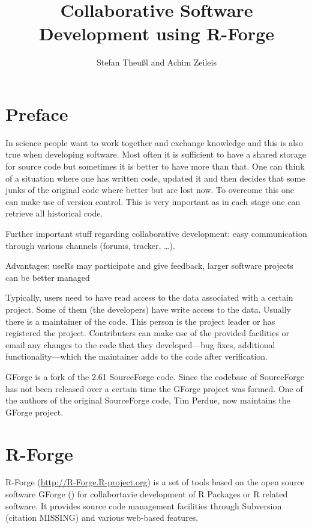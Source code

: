 \title{Collaborative Software Development using R-Forge}
\author{Stefan Theu\ss{}l and Achim Zeileis}

\maketitle


\section*{Preface}


In science people want to work together and exchange knowledge and
this is also true when developing software. Most often it is
sufficient to have a shared storage for source code but sometimes it
is better to have more than that. One can think of a situation where one has
written code, updated it and then decides that some junks of the
original code where better but are lost now. To overcome this one can
make use of version control. This is very important as in each stage
one can retrieve all historical code.

Further important stuff regarding collaborative development: easy
communication through various channels (forums, tracker, \ldots).

Advantages: useRs may participate and give feedback, larger software
projects can be better managed 

Typically, users need to have read access to the data associated with
a certain project. Some of them (the developers) have write access to
the data. Usually there is a maintainer of the code. This person is the project
leader or has registered the project. Contributers can make use of the
provided facilities or email any changes to the code
that they developed---bug fixes, additional functionality---which the
maintainer adds to the code after verification.


GForge is a fork of the 2.61 SourceForge code. Since the codebase of
SourceForge has not been released over a certain time the GForge
project was formed. One of the authors of the original SourceForge
code, Tim Perdue, now maintains the GForge project.


\section*{R-Forge}
R-Forge (\url{http://R-Forge.R-project.org}) is a set of tools based
on the open source software GForge (\cite{manual:gforge})%
 for collabortavie development of R Packages or R
related software. It provides source code management facilities
through Subversion (citation MISSING) and various web-based features. 

